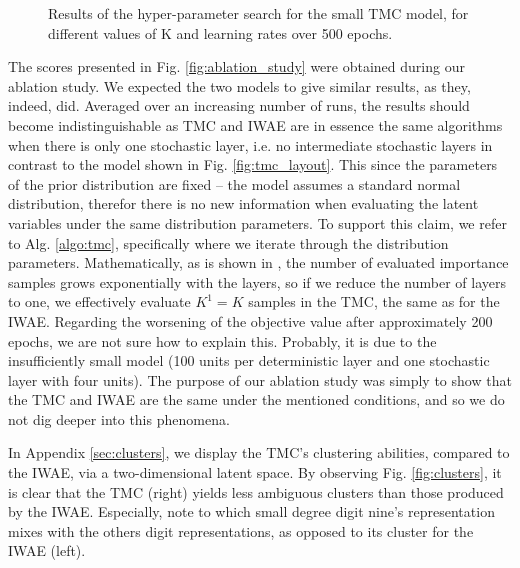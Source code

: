 \begin{figure}[th!]
\begin{subfigure}[t]{0.5\textwidth}
    \end{subfigure}
    \caption{Results of the hyper-parameter search for the small TMC model, for different values of K and learning rates over 500 epochs.}
    \label{fig:hp_search}
\end{figure}

The scores presented in Fig. \ref{fig:ablation_study} were obtained during our ablation study. We expected the two models to give similar results, as they, indeed, did. Averaged over an increasing number of runs, the results should become indistinguishable as TMC and IWAE are in essence the same algorithms when there is only one stochastic layer, i.e. no intermediate stochastic layers in contrast to the model shown in Fig. \ref{fig:tmc_layout}. This since the parameters of the prior distribution are fixed – the model assumes a standard normal distribution, therefor there is no new information when evaluating the latent variables under the same distribution parameters. To support this claim, we refer to Alg. \ref{algo:tmc}, specifically where we iterate through the distribution parameters. Mathematically, as is shown in \cite{tmc}, the number of evaluated importance samples grows exponentially with the layers, so if we reduce the number of layers to one, we effectively evaluate $K^1=K$ samples in the TMC, the same as for the IWAE. Regarding the worsening of the objective value after approximately 200 epochs, we are not sure how to explain this. Probably, it is due to the insufficiently small model (100 units per deterministic layer and one stochastic layer with four units). The purpose of our ablation study was simply to show that the TMC and IWAE are the same under the mentioned conditions, and so we do not dig deeper into this phenomena.

In Appendix \ref{sec:clusters}, we display the TMC's clustering abilities, compared to the IWAE, via a two-dimensional latent space. By observing Fig. \ref{fig:clusters}, it is clear that the TMC (right) yields less ambiguous clusters than those produced by the IWAE. Especially, note to which small degree digit nine's representation mixes with the others digit representations, as opposed to its cluster for the IWAE (left).

